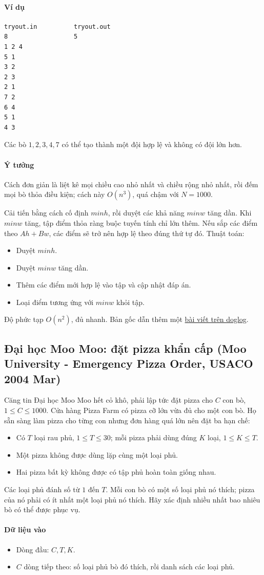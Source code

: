 \documentclass[11pt]{article}
\newcommand{\problem}[1]{\subsection{#1}}
\newcommand{\iosec}[1]{\paragraph{#1}}
\newcommand{\bigO}[1]{\ensuremath{O(#1)}}
\begin{document}
\iosec{Ví dụ}
\begin{verbatim}
tryout.in          tryout.out
8                  5
1 2 4
5 1
3 2
2 3
2 1
7 2
6 4
5 1
4 3
\end{verbatim}

Các bò \(1,2,3,4,7\) có thể tạo thành một đội hợp lệ và không có đội lớn hơn.

\iosec{Ý tưởng}
Cách đơn giản là liệt kê mọi chiều cao nhỏ nhất và chiều rộng nhỏ nhất, rồi đếm mọi bò thỏa điều kiện; cách này \(\bigO{n^3}\), quá chậm với \(N=1000\).

Cải tiến bằng cách cố định \(minh\), rồi duyệt các khả năng \(minw\) tăng dần. Khi \(minw\) tăng, tập điểm thỏa ràng buộc tuyến tính chỉ lớn thêm. Nếu sắp các điểm theo \(Ah+Bw\), các điểm sẽ trở nên hợp lệ theo đúng thứ tự đó. Thuật toán:
\begin{itemize}
  \item Duyệt \(minh\).
  \item Duyệt \(minw\) tăng dần.
  \item Thêm các điểm mới hợp lệ vào tập và cập nhật đáp án.
  \item Loại điểm tương ứng với \(minw\) khỏi tập.
\end{itemize}
Độ phức tạp \(\bigO{n^2}\), đủ nhanh. Bản gốc dẫn thêm một \href{http://blog.doglog.net/2009/03/2008-moo-university-team-tryouts/}{bài viết trên doglog}.

\problem{Đại học Moo Moo: đặt pizza khẩn cấp (Moo University - Emergency Pizza Order, USACO 2004 Mar)}

Căng tin Đại học Moo Moo hết cỏ khô, phải lập tức đặt pizza cho \(C\) con bò, \(1 \le C \le 1000\). Cửa hàng Pizza Farm có pizza cỡ lớn vừa đủ cho một con bò. Họ sẵn sàng làm pizza cho từng con nhưng đơn hàng quá lớn nên đặt ba hạn chế:
\begin{itemize}
  \item Có \(T\) loại rau phủ, \(1 \le T \le 30\); mỗi pizza phải dùng đúng \(K\) loại, \(1 \le K \le T\).
  \item Một pizza không được dùng lặp cùng một loại phủ.
  \item Hai pizza bất kỳ không được có tập phủ hoàn toàn giống nhau.
\end{itemize}
Các loại phủ đánh số từ \(1\) đến \(T\). Mỗi con bò có một số loại phủ nó thích; pizza của nó phải có ít nhất một loại phủ nó thích. Hãy xác định nhiều nhất bao nhiêu bò có thể được phục vụ.

\iosec{Dữ liệu vào}
\begin{itemize}
  \item Dòng đầu: \(C,T,K\).
  \item \(C\) dòng tiếp theo: số loại phủ bò đó thích, rồi danh sách các loại phủ.
\end{itemize}
\end{document}
